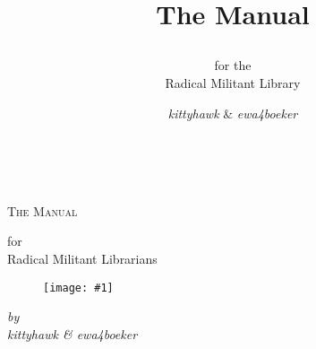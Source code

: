 \documentclass[english,11pt,paper=a4,DIV=calc]{scrartcl}
\title{
\begin{figure}[htbp]
\centering
\scalegraphics{img/rad-logo.png}
\end{figure}
\vspace{3cm}
The Manual}
\subtitle{for the\\Radical Militant Library}
\author{\emph{kittyhawk} \& \emph{ewa4boeker}}
\date{}%
\newlength{\imgwidth}
\newlength{\imgwidthmax}
\newcommand\scalegraphics[1]{%
    \settowidth{\imgwidth}{\texttt{[image: \#1]}}%
    \setlength{\imgwidth}{\minof{\imgwidthmax}{\minof{\imgwidth}{\textwidth}}}%
    \texttt{[image: \#1]}%
}
\begin{document}
\begin{titlepage}
	\centering
\hspace{1cm}\\
\vfill
	{\scshape\Huge The Manual \par}
	\vspace{1cm}
	{\Large for\\Radical Militant Librarians \par}
	
\vfill

\begin{figure}[htbp]
\centering
\scalegraphics{img/rad-logo.png}
\end{figure}

	\vspace{3cm}
	\emph{by\\%
		\vspace{1em}
		\emph{kittyhawk} \& \emph{ewa4boeker}
	}

\newpage

\end{titlepage}


\tableofcontents


\end{document}

